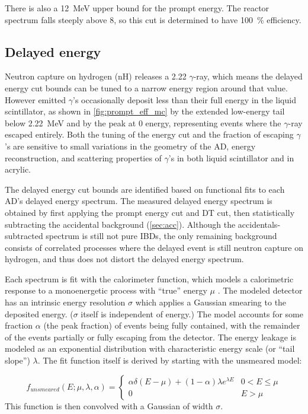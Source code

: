 There is also a \SI{12}{\mega\electronvolt} upper bound for the prompt energy.
The reactor \nuebar{} spectrum falls steeply above \SI{8}{\mev},
so this cut is determined to have \SI{100}{\percent} efficiency.

\subsection{Delayed energy}
\label{subsec:delayed}

Neutron capture on hydrogen (nH) releases a
\SI{2.22}{\mev} $\gamma$-ray,
which means the delayed energy cut bounds can be tuned to a narrow energy region
around that value.
However emitted $\gamma$'s occasionally
deposit less than their full energy in the liquid scintillator,
as shown in \cref{fig:prompt_eff_mc} by the extended low-energy tail
below \SI{2.22}{\MeV} and by the peak at \num{0} energy,
representing events where the $\gamma$-ray escaped entirely.
Both the tuning of the energy cut
and the fraction of escaping $\gamma$'s are sensitive to
small variations in the geometry of the AD, energy reconstruction,
and scattering properties of $\gamma$'s in
both liquid scintillator and in acrylic.

The delayed energy cut bounds are identified based on
functional fits to each AD's delayed energy spectrum.
The measured delayed energy spectrum is obtained by first applying
the prompt energy cut and DT cut,
then statistically subtracting the accidental background (\cref{sec:acc}).
Although the accidentals-subtracted spectrum is still not pure IBDs,
the only remaining background consists of correlated processes
where the delayed event is still
neutron capture on hydrogen, and thus does not distort
the delayed energy spectrum.

Each spectrum is fit with the calorimeter function, which models
a calorimetric response to a monoenergetic process with ``true''
energy $\mu$ \cite{calorimeter2016}.
The modeled detector has an intrinsic energy resolution $\sigma$
which applies a Gaussian smearing to the deposited energy.
($\sigma$ itself is independent of energy.)
The model accounts for some fraction $\alpha$ (the peak fraction)
of events being fully contained,
with the remainder of the events partially or fully escaping from the detector.
The energy leakage is modeled as an exponential distribution
with characteristic energy scale (or ``tail slope'') $\lambda$.
The fit function itself is derived by starting with
the unsmeared model:

\begin{equation}
    f_{unsmeared}(E;\mu,\lambda,\alpha) =
    \begin{cases}
        \alpha\delta(E-\mu) + (1-\alpha)\lambda e^{\lambda E}
        & 0 < E \leq \mu \\
        0 & E > \mu
    \end{cases}
\end{equation}
This function is then convolved with a Gaussian
of width $\sigma$.

